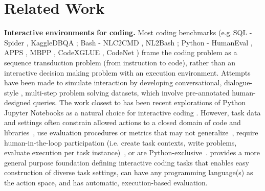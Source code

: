 \section{Related Work}
\label{sec:related}

\textbf{Interactive environments for coding.} 
Most coding benchmarks (e.g.\,SQL - Spider \cite{yu-etal-2018-spider}, KaggleDBQA \cite{lee-etal-2021-kaggledbqa}; Bash - NLC2CMD \cite{pmlr-v133-agarwal21b}, NL2Bash \cite{lin-etal-2018-nl2bash}; Python - HumanEval \cite{chen2021evaluating}, APPS \cite{hendrycksapps2021}, MBPP \cite{austin2021program}, CodeXGLUE \cite{lu2021codexglue}, CodeNet \cite{puri2021codenet}) frame the coding problem as a sequence transduction problem (from instruction to code), rather than an interactive decision making problem with an execution environment. 
Attempts have been made to simulate interaction by developing conversational, dialogue-style \cite{yu-etal-2019-sparc, yu2019cosql}, multi-step problem solving \cite{nijkamp2022codegen} datasets, which involve pre-annotated human-designed queries. The work closest to \benchmark{} has been recent explorations of Python Jupyter Notebooks as a natural choice for interactive coding \cite{huang-etal-2022-execution, Lai2022DS1000, yin2022natural}. However, task data and settings often constrain allowed actions to a closed domain of code and libraries~\cite{Lai2022DS1000, yin2022natural}, use evaluation procedures or metrics that may not generalize~\cite{huang-etal-2022-execution}, require human-in-the-loop participation (i.e. create task contexts, write problems, evaluate execution per task instance)~\cite{Lai2022DS1000}, or are Python-exclusive~\cite{huang-etal-2022-execution, Lai2022DS1000, yin2022natural, wang2023executionbased}.
\benchmark{} provides a more general purpose foundation defining interactive coding tasks that enables easy construction of diverse task settings, can have any programming language(s) as the action space, and has automatic, execution-based evaluation.

